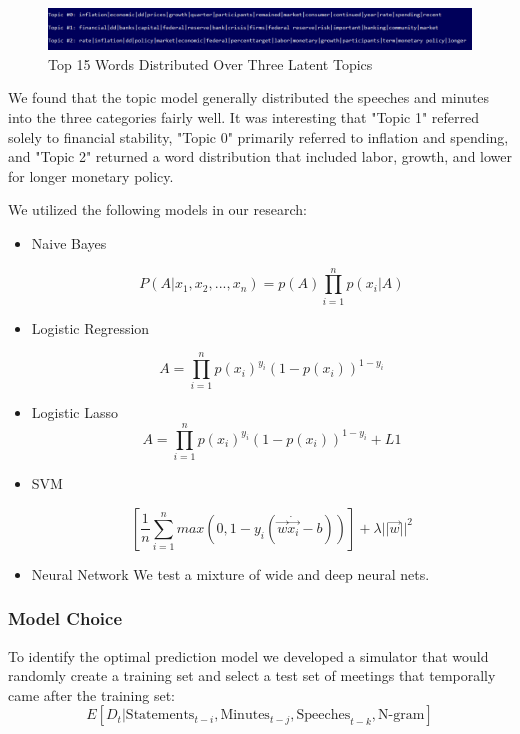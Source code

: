 \documentclass[11pt]{article}
\newcommand{\vertSpace}[1]{\vspace{3mm}}
\begin{document}
\begin{figure}[h!]
  \includegraphics[width=\linewidth]{../output/data_for_graphs/Topic-Model-3-topics.PNG}
  \caption{Top 15 Words Distributed Over Three Latent Topics}
  \label{fig:LDA}
\end{figure}

We found that the topic model generally distributed the speeches and minutes into the three categories fairly well.  It was interesting that "Topic 1" referred solely to financial stability, "Topic 0" primarily referred to inflation and spending, and "Topic 2" returned a word distribution that included labor, growth, and lower for longer monetary policy. \vertSpace

\subsubsection{Supervised Models}

We utilized the following models in our research: 

  \begin{itemize}

    \item Naive Bayes

      $$P(A|x_1,x_2,...,x_n) = p(A)\prod_{i=1}^n p(x_i|A)$$

    \item Logistic Regression

     $$A = \prod_{i=1}^n p(x_i)^{y_i}(1-p(x_i))^{1-y_i}$$

    \item Logistic Lasso
     $$A = \prod_{i=1}^n p(x_i)^{y_i}(1-p(x_i))^{1-y_i}+ L1$$
    \item SVM

     $$\left [\frac{1}{n} \sum_{i=1}^n max(0,1 - y_i(\vec{w} \dot \vec{x_i} - b)) \right] + \lambda ||\vec{w}||^2$$
    \item Neural Network
      We test a mixture of wide and deep neural nets. 
  \end{itemize}



\subsubsection{Model Choice} 

To identify the optimal prediction model we developed a simulator that would randomly create a training set and select a test set of meetings that temporally came after the training set: $$E[D_t | \mbox{Statements}_{t-i}, \mbox{Minutes}_{t-j} , \mbox{Speeches}_{t-k}, \mbox{N-gram}]$$  
\end{document}
